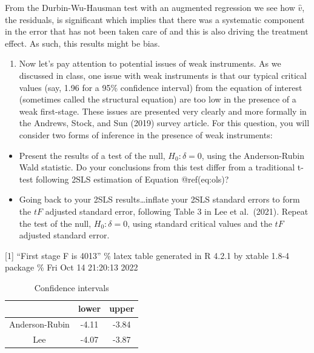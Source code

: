 \documentclass[
  12pt,
]{article}
\providecommand{\tightlist}{%
  \setlength{\itemsep}{0pt}\setlength{\parskip}{0pt}}
\begin{document}
From the Durbin-Wu-Hausman test with an augmented regression we see how
\(\hat{v}\), the residuals, is significant which implies that there was
a systematic component in the error that has not been taken care of and
this is also driving the treatment effect. As such, this results might
be bias.

\begin{enumerate}
\def\labelenumi{\arabic{enumi}.}
\setcounter{enumi}{6}
\tightlist
\item
  Now let's pay attention to potential issues of weak instruments. As we
  discussed in class, one issue with weak instruments is that our
  typical critical values (say, 1.96 for a 95\% confidence interval)
  from the equation of interest (sometimes called the structural
  equation) are too low in the presence of a weak first-stage. These
  issues are presented very clearly and more formally in the Andrews,
  Stock, and Sun (2019) survey article. For this question, you will
  consider two forms of inference in the presence of weak instruments:
\end{enumerate}

\begin{itemize}
\tightlist
\item
  Present the results of a test of the null, \(H_{0}: \delta=0\), using
  the Anderson-Rubin Wald statistic. Do your conclusions from this test
  differ from a traditional t-test following 2SLS estimation of Equation
  @ref(eq:ols)?
\item
  Going back to your 2SLS results\ldots inflate your 2SLS standard
  errors to form the \(tF\) adjusted standard error, following Table 3
  in Lee et al.~(2021). Repeat the test of the null,
  \(H_{0}: \delta=0\), using standard critical values and the \(tF\)
  adjusted standard error.
\end{itemize}

{[}1{]} ``First stage F is 4013'' \% latex table generated in R 4.2.1 by
xtable 1.8-4 package \% Fri Oct 14 21:20:13 2022

\begin{table}[ht]
\centering
\begin{tabular}{ccc}
  \hline
 & lower & upper \\ 
  \hline
Anderson-Rubin & -4.11 & -3.84 \\ 
  Lee & -4.07 & -3.87 \\ 
   \hline
\end{tabular}
\caption{Confidence intervals} 
\label{tab:ci}
\end{table}
\end{document}
